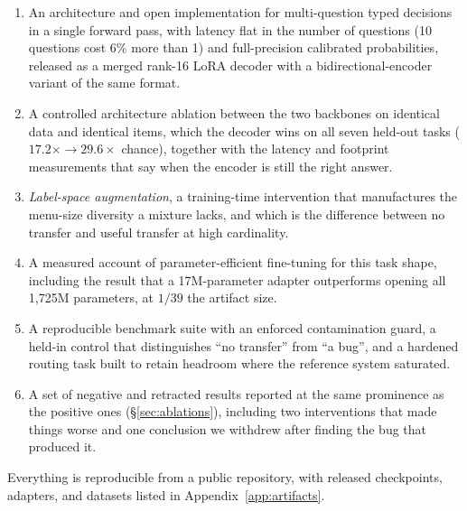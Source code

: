 \begin{enumerate}[leftmargin=1.5em,itemsep=0.25em]
  \item An architecture and open implementation for multi-question typed
    decisions in a single forward pass, with latency flat in the number of
    questions (10 questions cost 6\% more than 1) and full-precision
    calibrated probabilities, released as a merged rank-16 LoRA decoder
    with a bidirectional-encoder variant of the same format.
  \item A controlled architecture ablation between the two backbones on
    identical data and identical items, which the decoder wins on all
    seven held-out tasks ($17.2\times \to 29.6\times$ chance), together
    with the latency and footprint measurements that say when the
    encoder is still the right answer.
  \item \emph{Label-space augmentation}, a training-time intervention that
    manufactures the menu-size diversity a mixture lacks, and which is the
    difference between no transfer and useful transfer at high cardinality.
  \item A measured account of parameter-efficient fine-tuning for this task
    shape, including the result that a 17M-parameter adapter outperforms
    opening all 1{,}725M parameters, at $1/39$ the artifact size.
  \item A reproducible benchmark suite with an enforced contamination
    guard, a held-in control that distinguishes ``no transfer'' from ``a
    bug'', and a hardened routing task built to retain headroom where the
    reference system saturated.
  \item A set of negative and retracted results reported at the same
    prominence as the positive ones (\S\ref{sec:ablations}), including two
    interventions that made things worse and one conclusion we withdrew
    after finding the bug that produced it.
\end{enumerate}

Everything is reproducible from a public repository, with released
checkpoints, adapters, and datasets listed in Appendix~\ref{app:artifacts}.
